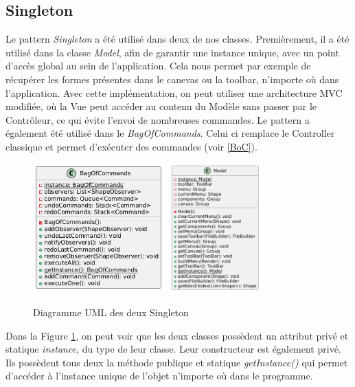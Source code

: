 \documentclass{article}
\begin{document}
\subsection{Singleton}

Le pattern \textit{Singleton} a été utilisé dans deux de nos classes. Premièrement, il a été utilisé dans la classe \textit{Model}, 
afin de garantir une instance unique, avec un point d'accès global au sein de l'application.
Cela nous permet par exemple de récupérer les formes présentes dans le canevas ou la toolbar, n'importe où dans l'application. Avec cette implémentation,
on peut utiliser une architecture MVC modifiée, où la Vue peut accéder au contenu du Modèle sans passer par le Contrôleur, ce qui évite l'envoi
de nombreuses commandes.
Le pattern a également été utilisé dans le \textit{BagOfCommands}. Celui ci remplace le Controller classique et permet d'exécuter des commandes (voir \ref{BoC}).

\begin{figure}[h]
    \centering
    \includegraphics[width=\textwidth,height=5.0cm,keepaspectratio]{singleton.png}
    \includegraphics[width=\textwidth,height=5.0cm,keepaspectratio]{singleton2.png}
    \caption{Diagramme UML des deux Singleton}
    \label{Singleton}
\end{figure}
\FloatBarrier

Dans la Figure \ref{Singleton}, on peut voir que les deux classes possèdent un attribut privé et statique \textit{instance}, du type de leur classe.
Leur constructeur est également privé. Ils possèdent tous deux la méthode publique et statique \textit{getInstance()} qui permet
d'accéder à l'instance unique de l'objet n'importe où dans le programme.
\end{document}
